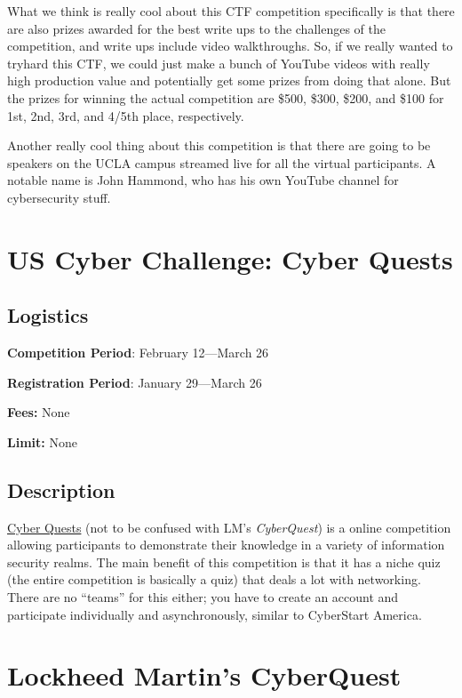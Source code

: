 \documentclass[
  letterpaper,
  DIV=11,
  numbers=noendperiod]{scrartcl}
\begin{document}
What we think is really cool about this CTF competition specifically is
that there are also prizes awarded for the best write ups to the
challenges of the competition, and write ups include video walkthroughs.
So, if we really wanted to tryhard this CTF, we could just make a bunch
of YouTube videos with really high production value and potentially get
some prizes from doing that alone. But the prizes for winning the actual
competition are \$500, \$300, \$200, and \$100 for 1st, 2nd, 3rd, and
4/5th place, respectively.

Another really cool thing about this competition is that there are going
to be speakers on the UCLA campus streamed live for all the virtual
participants. A notable name is John Hammond, who has his own YouTube
channel for cybersecurity stuff.

\hypertarget{us-cyber-challenge-cyber-quests}{%
\section{US Cyber Challenge: Cyber
Quests}\label{us-cyber-challenge-cyber-quests}}

\hypertarget{logistics-5}{%
\subsection{Logistics}\label{logistics-5}}

\textbf{Competition Period}: February 12---March 26

\textbf{Registration Period}: January 29---March 26

\textbf{Fees:} None

\textbf{Limit:} None

\hypertarget{description-5}{%
\subsection{Description}\label{description-5}}

\href{https://uscc.cyberquests.org/}{Cyber Quests} (not to be confused
with LM's \emph{CyberQuest}) is a online competition allowing
participants to demonstrate their knowledge in a variety of information
security realms. The main benefit of this competition is that it has a
niche quiz (the entire competition is basically a quiz) that deals a lot
with networking. There are no ``teams'' for this either; you have to
create an account and participate individually and asynchronously,
similar to CyberStart America.

\hypertarget{lockheed-martins-cyberquest}{%
\section{Lockheed Martin's
CyberQuest}\label{lockheed-martins-cyberquest}}
\end{document}
